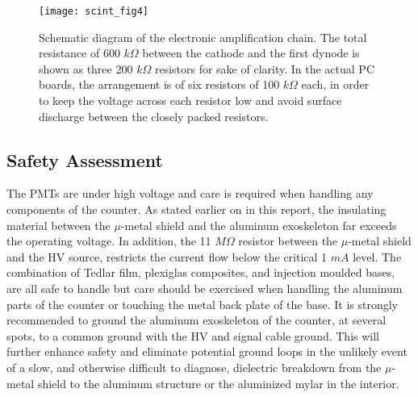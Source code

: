 %
%
\begin{figure}[p]
\texttt{[image: scint\_fig4]}
\caption[Aerogel: amplification chain]{
 Schematic diagram of the electronic amplification chain. The total 
 resistance of 600 $k\Omega$ between the cathode and the first dynode is shown 
 as three 200 $k\Omega$ resistors for sake of clarity. In the actual PC boards, 
 the arrangement is of six resistors of 100 $k\Omega$ each, in order to 
 keep the voltage across each resistor low and avoid surface discharge 
 between the closely packed resistors.
 }
\label{fig:aero_fig7}
\end{figure}

\subsection{Safety Assessment}

\begin{safetyen}{10}{10}
The PMTs are under high voltage and care is required when handling any 
components of the counter. As stated earlier on in this report, the insulating 
material between the $\mu$-metal shield and the aluminum exoskeleton far 
exceeds the operating voltage. In addition, the 11 $M\Omega$ resistor between 
the $\mu$-metal shield and the HV source, restricts the current flow below the  
critical 1 $mA$ level. The combination of Tedlar film, plexiglas composites, 
and injection moulded bases, are all safe to handle but care should be 
exercised when handling the aluminum parts of the counter or touching the metal 
back plate of the base. It is strongly recommended to ground the aluminum 
exoskeleton of the counter, at several spots, to a common ground with the HV 
and signal cable ground. This will further enhance safety and eliminate 
potential ground loops in the unlikely event of a slow, and otherwise difficult 
to diagnose, dielectric breakdown from the $\mu$-metal shield to the aluminum 
structure or the aluminized mylar in the interior.  
\end{safetyen}

